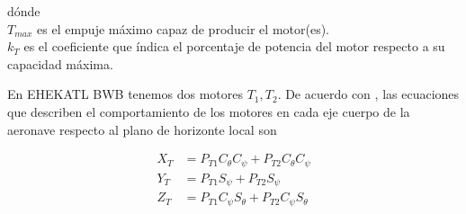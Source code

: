 dónde\\
$T_{max}$ es el empuje máximo capaz de producir el motor(es). \\
$k_T$ es el coeficiente que índica el porcentaje de potencia del motor respecto a su capacidad máxima.

En EHEKATL BWB tenemos dos motores $T_1 , T_2$. De acuerdo con \cite{USAF1988}, las ecuaciones que describen el comportamiento de los motores en cada eje cuerpo de la aeronave respecto al plano de horizonte local son

\begin{align}
\label{eq motor 1}
    X_{T} &= P_{T1} C_{\theta} C_{\psi} + P_{T2} C_{\theta} C_{\psi} \\
    Y_{T} &= P_{T1}  S_{\psi} + P_{T2}  S_{\psi}  \\
    Z_{T} &= P_{T1}  C_{\psi} S_{\theta} + P_{T2}  C_{\psi} S_{\theta} 
\label{eq motor 2}
\end{align}

